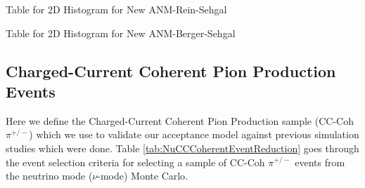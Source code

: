 \documentclass[11pt]{article}
\begin{document}
\newpage
\begin{landscape}
\begin{table}
\centering
\caption{Table for 2D Histogram for New ANM-Rein-Sehgal}
\begin{adjustbox}{width=\paperwidth}
\end{adjustbox}
\end{table}
\end{landscape}

\newpage
\begin{landscape}
\begin{table}
\centering
\caption{Table for 2D Histogram for New ANM-Berger-Sehgal}
\begin{adjustbox}{width=\paperwidth}
\end{adjustbox}
\end{table}
\end{landscape}



\subsection{Charged-Current Coherent Pion Production Events}\label{sub:CCCohPion}

Here we define the Charged-Current Coherent Pion Production sample (CC-Coh $\pi^{+/-}$) which we use to validate our acceptance model against previous simulation studies which were done. Table \ref{tab:NuCCCoherentEventReduction} goes through the event selection criteria for selecting a sample of CC-Coh $\pi^{+/-}$ events from the neutrino mode ($\nu$-mode) Monte Carlo.
\end{document}
